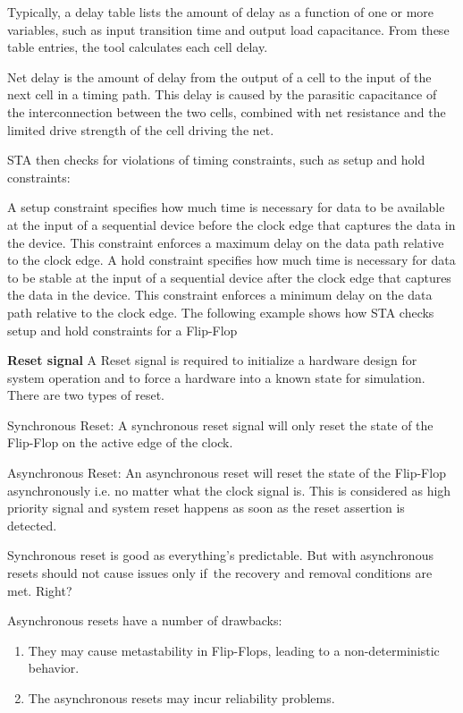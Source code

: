 Typically, a delay table lists the amount of delay as a function of one or more variables, such as input transition time and output load capacitance. From these table entries, the tool calculates each cell delay.

Net delay is the amount of delay from the output of a cell to the input of the next cell in a timing path. This delay is caused by the parasitic capacitance of the interconnection between the two cells, combined with net resistance and the limited drive strength of the cell driving the net.

STA then checks for violations of timing constraints, such as setup and hold constraints:

A setup constraint specifies how much time is necessary for data to be available at the input of a sequential device before the clock edge that captures the data in the device. This constraint enforces a maximum delay on the data path relative to the clock edge.
A hold constraint specifies how much time is necessary for data to be stable at the input of a sequential device after the clock edge that captures the data in the device. This constraint enforces a minimum delay on the data path relative to the clock edge.
The following example shows how STA checks setup and hold constraints for a Flip-Flop

\clearpage

\textbf{Reset signal}
A Reset signal is required to initialize a hardware design for system operation and to force a hardware into a known state for simulation. There are two types of reset.

Synchronous Reset: A synchronous reset signal will only reset the state of the Flip-Flop on the active edge of the clock.
 
Asynchronous Reset: An asynchronous reset will reset the state of the Flip-Flop asynchronously i.e. no matter what the clock signal is. This is considered as high priority signal and system reset happens as soon as the reset assertion is detected.


Synchronous reset is good as everything's predictable. But with asynchronous resets should not cause issues only if the recovery and removal conditions are met. Right?

Asynchronous resets have a number of drawbacks:
\begin{enumerate}
    \item They may cause metastability in Flip-Flops, leading to a non-deterministic behavior.
    \item The asynchronous resets may incur reliability problems. 
\end{enumerate}

